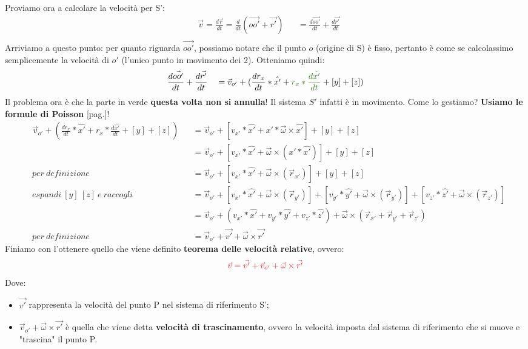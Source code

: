                 Proviamo ora a calcolare la velocità per S':
                \begin{align*}
                    & \vec{v}=\frac{d\vec{r}}{dt}=\frac{d}{dt}(\vec{oo'}+\vec{r'}) &&=\frac{d\vec{oo'}}{dt}+\frac{d\vec{r'}}{dt}\\
                \end{align*}
                Arriviamo a questo punto: per quanto riguarda $\vec{oo'}$, possiamo notare che il punto $o$ (origine di S) è fisso, pertanto è come se calcolassimo semplicemente la velocità di $o'$ (l'unico punto in movimento dei 2). Otteniamo quindi:
                \begin{align*}
                    & \frac{d\vec{oo'}}{dt}+\frac{d\vec{r'}}{dt} &&= \vec{v}_{o'} +(\frac{dr_x}{dt}*\hat{x'}+ \textcolor{OliveGreen}{r_x *\frac{d\hat{x'}}{dt}}+[y]+[z]) \\
                \end{align*}
                Il problema ora è che \textcolor{OliveGreen}{la parte in verde} \textbf{questa volta non si annulla}! Il sistema $S'$ infatti è in movimento. Come lo gestiamo? \textbf{Usiamo le formule di Poisson} [pag.\pageref{Poisson}]!
                \begin{align*}
                    & \vec{v}_{o'} +(\frac{dr_x}{dt}*\hat{x'}+ r_x *\frac{d\hat{x'}}{dt}+[y]+[z]) &&= \vec{v}_{o'} +[ v_{x'}*\hat{x'}+ x'*\vec{\omega}\times\hat{x'}]+[y]+[z]\\
                    & && =\vec{v}_{o'} +[ v_{x'}*\hat{x'}+ \vec{\omega}\times(x'*\hat{x'})]+[y]+[z]\\
                    & per\ definizione&& =\vec{v}_{o'} +[ v_{x'}*\hat{x'}+ \vec{\omega}\times(\vec{r}_{x'})]+[y]+[z]\\
                    & espandi\ [y]\ [z]\ e\ raccogli&& =\vec{v}_{o'} +[ v_{x'}*\hat{x'}+ \vec{\omega}\times(\vec{r}_{y'})]+[ v_{y'}*\hat{y'}+ \vec{\omega}\times(\vec{r}_{y'})]+[ v_{z'}*\hat{z'}+ \vec{\omega}\times(\vec{r}_{z'})]\\
                    & && =\vec{v}_{o'} + (v_{x'}*\hat{x'} + v_{y'}*\hat{y'} + v_{z'}*\hat{z'}) + \vec{\omega}\times(\vec{r}_{x'}+\vec{r}_{y'}+\vec{r}_{z'})\\
                    & per\ definizione&&=\vec{v}_{o'} + \vec{v'} + \vec{\omega}\times\vec{r'}
                \end{align*}
                Finiamo con l'ottenere quello che viene definito \textbf{teorema delle velocità relative}, ovvero:
                \begin{align*}
                    \textcolor{Red}{\vec{v}=\vec{v'} + \vec{v}_{o'} + \vec{\omega}\times\vec{r'}}
                \end{align*}
                Dove:
                \begin{itemize}
                    \item $\vec{v'}$ rappresenta la velocità del punto P nel sistema di riferimento S';
                    \item $\vec{v}_{o'} + \vec{\omega}\times\vec{r'}$ è quella che viene detta \textbf{velocità di trascinamento}, ovvero la velocità imposta dal sistema di riferimento che si muove e "trascina" il punto P.
                \end{itemize}

